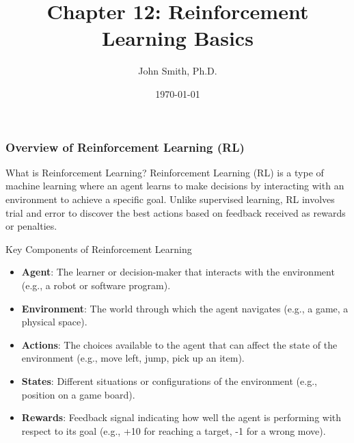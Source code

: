 \documentclass[aspectratio=169]{beamer}
\title[Reinforcement Learning Basics]{Chapter 12: Reinforcement Learning Basics}
\author[J. Smith]{John Smith, Ph.D.}
\institute[University Name]{
  Department of Computer Science\\
  University Name\\
  \vspace{0.3cm}
  Email: email@university.edu\\
  Website: www.university.edu
}
\date{\today}
\begin{document}
\frame{\titlepage}

\begin{frame}[fragile]
    \titlepage
\end{frame}

\begin{frame}[fragile]
    \frametitle{Overview of Reinforcement Learning (RL)}

    \begin{block}{What is Reinforcement Learning?}
        Reinforcement Learning (RL) is a type of machine learning where an agent learns to make decisions by interacting with an environment to achieve a specific goal. 
        Unlike supervised learning, RL involves trial and error to discover the best actions based on feedback received as rewards or penalties.
    \end{block}
    
    \begin{block}{Key Components of Reinforcement Learning}
        \begin{itemize}
            \item \textbf{Agent}: The learner or decision-maker that interacts with the environment (e.g., a robot or software program).
            \item \textbf{Environment}: The world through which the agent navigates (e.g., a game, a physical space).
            \item \textbf{Actions}: The choices available to the agent that can affect the state of the environment (e.g., move left, jump, pick up an item).
            \item \textbf{States}: Different situations or configurations of the environment (e.g., position on a game board).
            \item \textbf{Rewards}: Feedback signal indicating how well the agent is performing with respect to its goal (e.g., +10 for reaching a target, -1 for a wrong move).
        \end{itemize}
    \end{block}
\end{frame}
\end{document}
